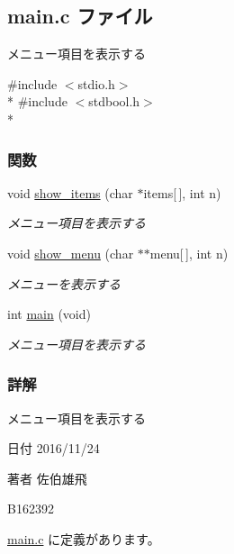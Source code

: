 \subsection{main.\-c ファイル}
\label{main_8c}


メニュー項目を表示する  


{\ttfamily \#include $<$stdio.\-h$>$}\\*
{\ttfamily \#include $<$stdbool.\-h$>$}\\*
\subsubsection*{関数}
\begin{DoxyCompactItemize}
\item 
void \hyperlink{main_8c_ade977e2860c479f072d77351eacf3a4b}{show\-\_\-items} (char $\ast$items\mbox{[}$\,$\mbox{]}, int n)
\begin{DoxyCompactList}\small\item\em メニュー項目を表示する \end{DoxyCompactList}\item 
void \hyperlink{main_8c_a4cf619ef194bbf1495713cc88b50233a}{show\-\_\-menu} (char $\ast$$\ast$menu\mbox{[}$\,$\mbox{]}, int n)
\begin{DoxyCompactList}\small\item\em メニューを表示する \end{DoxyCompactList}\item 
int \hyperlink{main_8c_a840291bc02cba5474a4cb46a9b9566fe}{main} (void)
\begin{DoxyCompactList}\small\item\em メニュー項目を表示する \end{DoxyCompactList}\end{DoxyCompactItemize}


\subsubsection{詳解}
メニュー項目を表示する \begin{DoxyDate}{日付}
2016/11/24 
\end{DoxyDate}
\begin{DoxyAuthor}{著者}
佐伯雄飛 

B162392 
\end{DoxyAuthor}


 \hyperlink{main_8c_source}{main.\-c} に定義があります。



